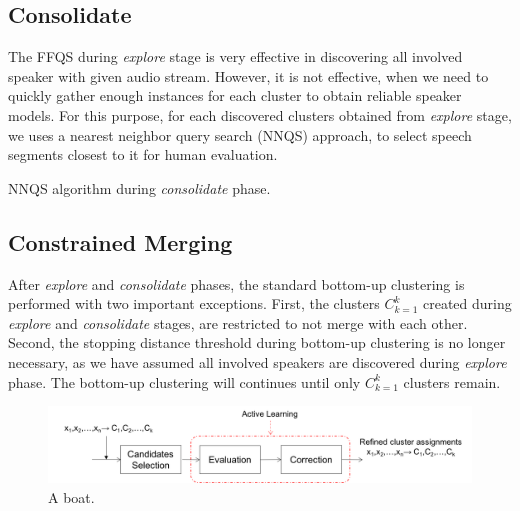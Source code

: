 \documentclass[final,authoryear,5p,times,twocolumn]{elsarticle}
\begin{document}
\subsection{Consolidate}
The FFQS during \textit{explore} stage is very effective in discovering all involved speaker with given audio stream. However, it is not effective, when we need to quickly gather enough instances for each cluster to obtain reliable speaker models. For this purpose, for each discovered clusters obtained from \textit{explore} stage, we uses a nearest neighbor query search (NNQS) approach, to select speech segments closest to it for human evaluation.  

\begin{algorithm}
	\caption{NNQS algorithm during \textit{consolidate} phase.}
\end{algorithm}

\subsection{Constrained Merging}
After \textit{explore} and \textit{consolidate} phases, the standard bottom-up clustering is performed with two important exceptions. First, the clusters $C_{k=1}^{k}$ created during \textit{explore} and \textit{consolidate} stages, are restricted to not merge with each other. Second, the stopping distance threshold during bottom-up clustering is no longer necessary, as we have assumed all involved speakers are discovered during \textit{explore} phase. The bottom-up clustering will continues until only $C_{k=1}^{k}$ clusters remain.

\begin{figure}
	\includegraphics[width=\linewidth]{figs/flow4}
	\caption{A boat.}
	\label{fig:boat1}
\end{figure}
\end{document}
